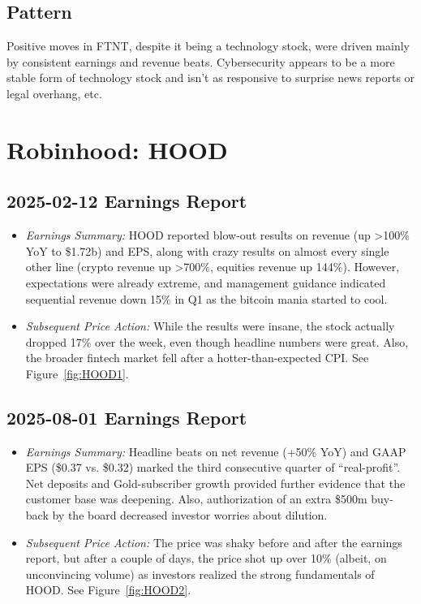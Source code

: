 \documentclass[11pt]{article}
\begin{document}
    \subsection{Pattern}
        Positive moves in FTNT, despite it being a technology stock, were driven mainly by consistent earnings and revenue beats. Cybersecurity appears to be a more stable form of technology stock and isn't as responsive to surprise news reports or legal overhang, etc.
\section{Robinhood: HOOD}
    \subsection{2025-02-12 Earnings Report}
        \begin{itemize}
            \item \textit{Earnings Summary:} HOOD reported blow-out results on revenue (up >100\% YoY to \$1.72b) and EPS, along with crazy results on almost every single other line (crypto revenue up >700\%, equities revenue up 144\%). However, expectations were already extreme, and management guidance indicated sequential revenue down 15\% in Q1 as the bitcoin mania started to cool.
            \item \textit{Subsequent Price Action:} While the results were insane, the stock actually dropped 17\% over the week, even though headline numbers were great. Also, the broader fintech market fell after a hotter-than-expected CPI. See Figure~\ref{fig:HOOD1}.
        \end{itemize}
    \subsection{2025-08-01 Earnings Report}
        \begin{itemize}
            \item \textit{Earnings Summary:} Headline beats on net revenue (+50\% YoY) and GAAP EPS (\$0.37 vs. \$0.32) marked the third consecutive quarter of ``real-profit''. Net deposits and Gold-subscriber growth provided further evidence that the customer base was deepening. Also, authorization of an extra \$500m buy-back by the board decreased investor worries about dilution.
            \item \textit{Subsequent Price Action:} The price was shaky before and after the earnings report, but after a couple of days, the price shot up over 10\% (albeit, on unconvincing volume) as investors realized the strong fundamentals of HOOD. See Figure~\ref{fig:HOOD2}.
        \end{itemize}
\end{document}

